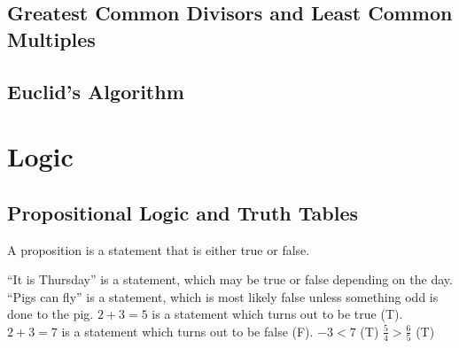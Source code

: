 \section{Greatest Common Divisors and Least Common Multiples}
\label{sec:GCDandLCM}

\section{Euclid's Algorithm}
\label{sec:EuclidsAlgorithm}


\chapter{Logic}
\label{chap:Review}

\section{Propositional Logic and Truth Tables}
\label{sec:PropositionalLogicAndTruthTables}

A proposition is a statement that is either true or false.

``It is Thursday'' is a statement, which may be true or false depending on the
day.
``Pigs can fly'' is a statement, which is most likely false unless something odd
is done to the pig.
$2 + 3 = 5$ is a statement which turns out to be true (T).
$2 + 3 = 7$ is a statement which turns out to be false (F).
$ -3 < 7  $ (T)
$\frac{5}{4} > \frac{6}{5}$ (T)

